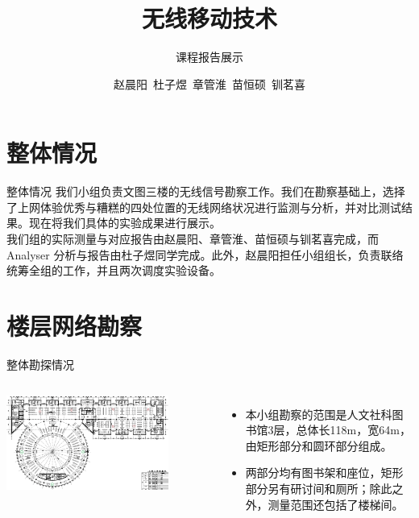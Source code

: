 \documentclass[aspectratio=169]{beamer}
\title{\Huge{{无线移动技术}}} %
\subtitle{课程报告展示} %
\author{赵晨阳\ 杜⼦煜\ 章管淮\ 苗恒硕\ 钏茗喜 \\ \zhtoday}
\begin{document}
  \shorthandoff{-}
  \frame[c]{\maketitle}


    \section{整体情况}
    \begin{frame}{整体情况}
      我们小组负责⽂图三楼的无线信号勘察工作。我们在勘察基础上，选择了上⽹体验优秀与糟糕的四处位置的⽆线⽹络状况进⾏监测与分析，并对比测试结果。现在将我们具体的实验成果进行展示。\\\bigskip
      我们组的实际测量与对应报告由赵晨阳、章管淮、苗恒硕与钏茗喜完成，而 Analyser 分析与报告由杜⼦煜同学完成。此外，赵晨阳担任小组组长，负责联络统筹全组的工作，并且两次调度实验设备。
    \end{frame}


    \section{楼层网络勘察}
    \begin{frame}{整体勘探情况}
      \begin{columns}[onlytextwidth]
        \includegraphics[width=0.8\textwidth]{resources/楼层地图.png}
          \begin{itemize}
            \item 本小组勘察的范围是人文社科图书馆3层，总体长118m，宽64m，由矩形部分和圆环部分组成。
            \item 两部分均有图书架和座位，矩形部分另有研讨间和厕所；除此之外，测量范围还包括了楼梯间。
          \end{itemize}
      \end{columns}
    \end{frame}
\end{document}
